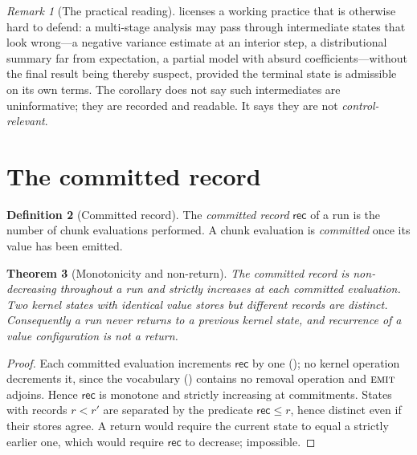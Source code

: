 \documentclass[11pt,a4paper]{article}
\theoremstyle{thmstyle}
\newtheorem{theorem}{Theorem}[section]
\theoremstyle{definition}
\newtheorem{definition}[theorem]{Definition}
\theoremstyle{remark}
\newtheorem{remark}[theorem]{Remark}
\newcommand{\rec}{\mathsf{rec}}
\newcommand{\emit}{\textsc{emit}}
\begin{document}
\begin{remark}[The practical reading]
\label{rem:practical}
 licenses a working practice that is otherwise hard to
defend: a multi-stage analysis may pass through intermediate states that
look wrong---a negative variance estimate at an interior step, a
distributional summary far from expectation, a partial model with absurd
coefficients---without the final result being thereby suspect, provided the
terminal state is admissible on its own terms. The corollary does not say
such intermediates are uninformative; they are recorded and readable. It
says they are not \emph{control-relevant}.
\end{remark}

\section{The committed record}
\label{sec:record}

\begin{definition}[Committed record]
\label{def:record}
The \emph{committed record} $\rec$ of a run is the number of chunk
evaluations performed. A chunk evaluation is \emph{committed} once its value
has been emitted.
\end{definition}

\begin{theorem}[Monotonicity and non-return]
\label{thm:monotone}
The committed record is non-decreasing throughout a run and strictly
increases at each committed evaluation. Two kernel states with identical
value stores but different records are distinct. Consequently a run never
returns to a previous kernel state, and recurrence of a value configuration
is not a return.
\end{theorem}

\begin{proof}
Each committed evaluation increments $\rec$ by one (); no
kernel operation decrements it, since the vocabulary
() contains no removal operation and $\emit$ adjoins. Hence
$\rec$ is monotone and strictly increasing at commitments. States with
records $r<r'$ are separated by the predicate $\rec\le r$, hence distinct
even if their stores agree. A return would require the current state to
equal a strictly earlier one, which would require $\rec$ to decrease;
impossible.
\end{proof}
\end{document}
